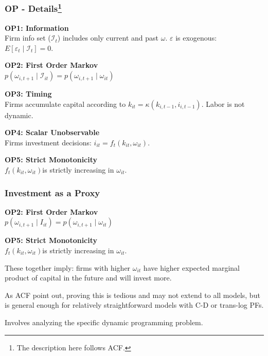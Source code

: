 \documentclass[11pt, aspectratio=169]{beamer}
\newenvironment{wideitemize}{\itemize\addtolength{\itemsep}{10pt}}{\enditemize}
\begin{document}
\begin{frame}[c]\frametitle{OP - Details\footnote{The description here follows ACF.}}
    
\textbf{OP1: Information}\\
Firm info set ($\mathcal{I}_t$) includes only current and past $\omega$. $\varepsilon$ is exogenous: $E[\varepsilon_t \mid \mathcal{I}_t] = 0$. 

\bigskip
\textbf{OP2: First Order Markov}\\
$p(\omega_{i,t+1} \mid \mathcal{I}_{it}) = p(\omega_{i,t+1} \mid \omega_{it}) $

\bigskip
\textbf{OP3: Timing}\\
Firms accumulate capital according to $k_{it} = \kappa(k_{i,t-1},i_{i,t-1})$. Labor is not dynamic. 

\bigskip
\textbf{OP4: Scalar Unobservable}\\
Firms investment decisions: $i_{it} = f_t(k_{it},\omega_{it})$.

\bigskip
\textbf{OP5: Strict Monotonicity}\\
$f_t(k_{it},\omega_{it})$is strictly increasing in $\omega_{it}$.

\end{frame}



\begin{frame}[c]\frametitle{Investment as a Proxy}
    
\textbf{OP2: First Order Markov}\\
$p(\omega_{i,t+1} \mid I_{it}) = p(\omega_{i,t+1} \mid \omega_{it}) $

\bigskip
\textbf{OP5: Strict Monotonicity}\\
$f_t(k_{it},\omega_{it})$is strictly increasing in $\omega_{it}$.

\bigskip
These together imply: firms with higher $\omega_{it}$ have higher expected marginal product of capital in the future and will invest more. 

\bigskip
As ACF point out, proving this is tedious and may not extend to all models, but is general enough for relatively straightforward models with C-D or trans-log PFs.

\begin{wideitemize}
 	\item Involves analyzing the specific dynamic programming problem.
\end{wideitemize}



\end{frame}
\end{document}
